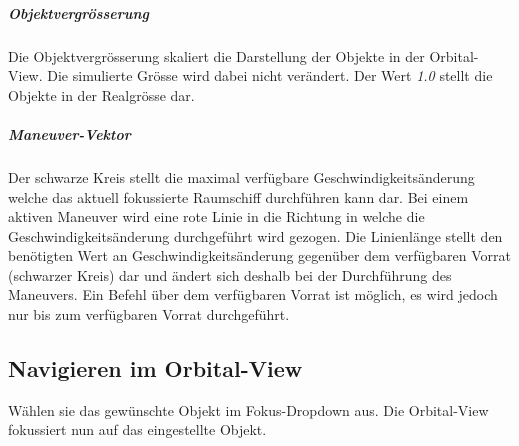 \subparagraph{Objektvergrösserung}
Die Objektvergrösserung skaliert die Darstellung der Objekte in der Orbital-View. Die simulierte Grösse wird dabei nicht verändert. Der Wert \emph{1.0} stellt die Objekte in der Realgrösse dar.

\subparagraph{Maneuver-Vektor}
Der schwarze Kreis stellt die maximal verfügbare Geschwindigkeitsänderung welche das aktuell fokussierte Raumschiff durchführen kann dar. Bei einem aktiven Maneuver wird eine rote Linie in die Richtung in welche die Geschwindigkeitsänderung durchgeführt wird gezogen. Die Linienlänge stellt den benötigten Wert an Geschwindigkeitsänderung gegenüber dem verfügbaren Vorrat (schwarzer Kreis) dar und ändert sich deshalb bei der Durchführung des Maneuvers. Ein Befehl über dem verfügbaren Vorrat ist möglich, es wird jedoch nur bis zum verfügbaren Vorrat durchgeführt.

\subsection{Navigieren im Orbital-View}
Wählen sie das gewünschte Objekt im Fokus-Dropdown aus.
Die Orbital-View fokussiert nun auf das eingestellte Objekt.

